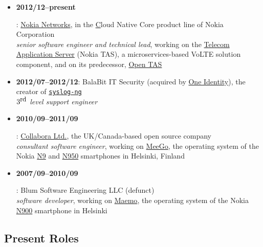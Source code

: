 \documentclass[a4paper,12pt]{article}
\newcommand{\compress}{\setlength\itemsep{-\parskip}}
\newenvironment{compressedItemize}{\begin{itemize}\compress}{\end{itemize}}
\begin{document}
\begin{compressedItemize}
\item	\hypertarget{TAS}{\textbf{2012/12--present}}:
	\href{http://networks.nokia.com}{Nokia Networks}, in the
	\href{http://networks.nokia.com/portfolio/cloud-native-core}
	Cloud Native Core product line of Nokia Corporation \\
	\textit{senior software engineer and technical lead}, working on the
	\href{http://networks.nokia.com/products/telecom-application-server}%
	{Telecom Application Server} (Nokia TAS), a microservices-based VoLTE
	solution component, and on its predecessor,
	\href{http://networks.nokia.com/products/open-telecom-application-server-tas-old}{Open TAS}
\item	\textbf{2012/07--2012/12}:
	BalaBit IT Security (acquired by
	\href{http://www.oneidentity.com}{One Identity}),
	the creator of \href{https://www.syslog-ng.com/products/open-source-log-management/}{\texttt{syslog-ng}} \\
	\textit{$3^{\textrm{\small rd}}$ level support engineer}
\item	\hypertarget{MeeGo}{\textbf{2010/09--2011/09}}:
	\href{http://www.collabora.com/about-us}{Collabora Ltd.},
	the UK/Canada-based open source company \\
	\textit{consultant software engineer}, working on
	\href{http://en.wikipedia.org/wiki/MeeGo}{MeeGo}, the operating system
	of the Nokia \href{http://en.wikipedia.org/wiki/Nokia_N9}{N9} and
	\href{http://en.wikipedia.org/wiki/Nokia_N950}{N950} smartphones
	in Helsinki, Finland
\item	\hypertarget{Maemo}{\textbf{2007/09--2010/09}}:
	Blum Software Engineering LLC (defunct) \\
	\textit{software developer}, working on \href{http://maemo.org}{Maemo},
	the operating system of the Nokia
	\href{http://maemo.org/intro/maemo_history}{N900} smartphone
	in Helsinki
\end{compressedItemize}

\subsection*{Present Roles}
\end{document}
